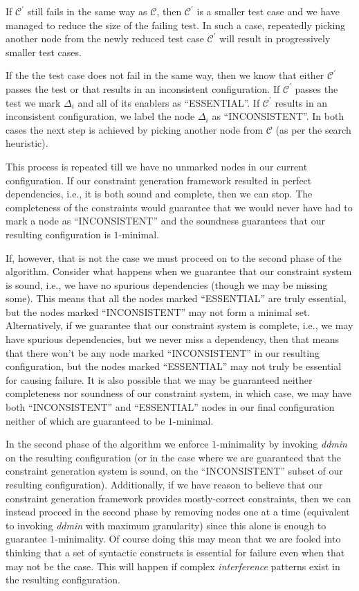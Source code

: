 \documentclass[preprint]{acm_proc_article-sp}
\begin{document}
If $\mathcal{C}^{'}$ still fails in the same way as $\mathcal{C}$, then
$\mathcal{C}^{'}$ is a smaller test case and we have managed to reduce the size
of the failing test. In such a case, repeatedly picking another node from the
newly reduced test case $\mathcal{C}^{'}$ will result in progressively smaller
test cases.

If the the test case does not fail in the same way, then we know that either
$\mathcal{C}^{'}$ passes the test or that results in an inconsistent
configuration. If $\mathcal{C}^{'}$ passes the test we mark $\Delta_i$ and all
of its enablers as ``ESSENTIAL''. If $\mathcal{C}^{'}$ results in an
inconsistent configuration, we label the node $\Delta_i$ as ``INCONSISTENT''.
In both cases the next step is achieved by picking another node from
$\mathcal{C}$ (as per the search heuristic).

This process is repeated till we have no unmarked nodes in our current
configuration. If our constraint generation framework resulted in perfect
dependencies, i.e., it is both sound and complete, then we can stop. The
completeness of the constraints would guarantee that we would never have had to
mark a node as ``INCONSISTENT'' and the soundness guarantees that our resulting
configuration is $1$-minimal.

If, however, that is not the case we must proceed on to the second phase of the
algorithm. Consider what happens when we guarantee that our constraint system is
sound, i.e., we have no spurious dependencies (though we may be missing some).
This means that all the nodes marked ``ESSENTIAL'' are truly essential, but the
nodes marked ``INCONSISTENT'' may not form a minimal set. Alternatively, if we
guarantee that our constraint system is complete, i.e., we may have spurious
dependencies, but we never miss a dependency, then that means that there won't
be any node marked ``INCONSISTENT'' in our resulting configuration, but the
nodes marked ``ESSENTIAL'' may not truly be essential for causing failure. It is
also possible that we may be guaranteed neither completeness nor soundness of
our constraint system, in which case, we may have both ``INCONSISTENT'' and
``ESSENTIAL'' nodes in our final configuration neither of which are guaranteed
to be $1$-minimal.

In the second phase of the algorithm we enforce $1$-minimality by invoking
\emph{ddmin} \citep{dd} on the resulting configuration (or in the case where we
are guaranteed that the constraint generation system is sound, on the
``INCONSISTENT'' subset of our resulting configuration). Additionally, if we
have reason to believe that our constraint generation framework provides
mostly-correct constraints, then we can instead proceed in the second phase by
removing nodes one at a time (equivalent to invoking \emph{ddmin} with maximum
granularity) since this alone is enough to guarantee $1$-minimality. Of course
doing this may mean that we are fooled into thinking that a set of syntactic
constructs is essential for failure even when that may not be the case. This
will happen if complex \emph{interference} patterns \cite{zeller99} exist in the
resulting configuration.
\end{document}
